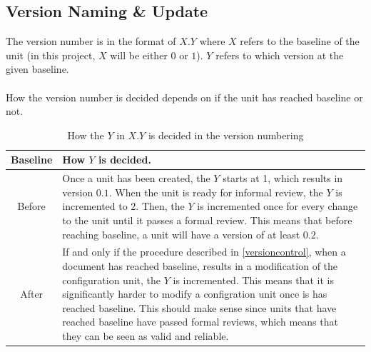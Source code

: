 \documentclass{article}
\begin{document}
    \subsection{Version Naming \& Update}
        The version number is in the format of $X.Y$ where $X$ refers to the baseline
        of the unit (in this project, $X$ will be either $0$ or $1$). $Y$ refers
        to which version at the given baseline.
        \\ \\
        How the version number is decided depends on if the unit has reached baseline or not.
        \begin{table}[h]
            \centering
            \begin{tabular}{|c|l|}
                \hline
                    \textbf{Baseline} & \textbf{How $Y$ is decided.} \\
                \hline
                    Before & \parbox{.8\textwidth} { \vspace{.2cm}
                            Once a unit has been created, the $Y$
                            starts at 1, which results in version $0.1$. When the unit is ready for informal
                            review, the $Y$ is incremented to 2. Then, the $Y$ is incremented once for every change to the unit until it passes a formal review. This means that before reaching baseline, a unit will have a version of at least $0.2$.
                            \vspace{.2cm} } \\
                \hline
                    After & \parbox{.8\textwidth} { \vspace{.2cm}
                        If and only if the procedure described in \ref{versioncontrol}, when a document has reached baseline, results in a modification of the
                        configuration unit, the $Y$ is incremented. This means that
                        it is significantly harder to modify a configration unit once
                        is has reached baseline. This should make sense since units
                        that have reached baseline have passed formal reviews, which means
                        that they can be seen as valid and reliable.
                        \vspace{.2cm}} \\
                \hline
            \end{tabular}
            \caption{How the $Y$ in $X.Y$ is decided in the version numbering}
            \label{versionnumber}
        \end{table}
\end{document}
